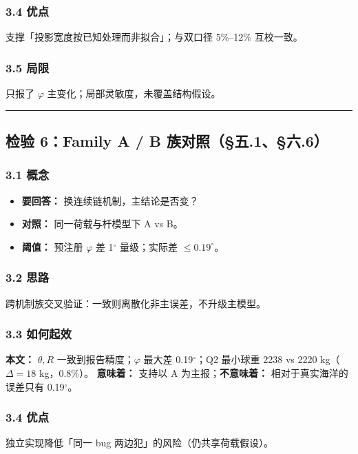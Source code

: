 \documentclass[UTF8,a4paper,zihao=-4]{ctexart}
\begin{document}
\subsubsection{\texorpdfstring{3.4 优点}{3.4 优点}}
支撑「投影宽度按已知处理而非拟合」；与双口径 5\%--12\% 互校一致。

\subsubsection{\texorpdfstring{3.5 局限}{3.5 局限}}
只报了 \(\varphi\) 主变化；局部灵敏度，未覆盖结构假设。

\vspace{0.4em}\hrule\vspace{0.4em}

\subsection{\texorpdfstring{检验 6：Family A / B 族对照（§五.1、§六.6）}{检验 6：Family A / B 族对照（§五.1、§六.6）}}

\subsubsection{\texorpdfstring{3.1 概念}{3.1 概念}}
\begin{itemize}[leftmargin=1.5em]
\item \textbf{要回答：} 换连续链机制，主结论是否变？
\item \textbf{对照：} 同一荷载与杆模型下 A vs B。
\item \textbf{阈值：} 预注册 \(\varphi\) 差 1$^\circ$ 量级；实际差 \(\le0.19^\circ\)。
\end{itemize}

\subsubsection{\texorpdfstring{3.2 思路}{3.2 思路}}
跨机制族交叉验证：一致则离散化非主误差，不升级主模型。

\subsubsection{\texorpdfstring{3.3 如何起效}{3.3 如何起效}}
\textbf{本文：} \(\theta,R\) 一致到报告精度；\(\varphi\) 最大差 0.19$^\circ$；Q2 最小球重 2238 vs 2220 kg（\(\Delta=18\) kg，0.8\%）。  
\textbf{意味着：} 支持以 A 为主报；\textbf{不意味着：} 相对于真实海洋的误差只有 0.19$^\circ$。

\subsubsection{\texorpdfstring{3.4 优点}{3.4 优点}}
独立实现降低「同一 bug 两边犯」的风险（仍共享荷载假设）。
\end{document}
